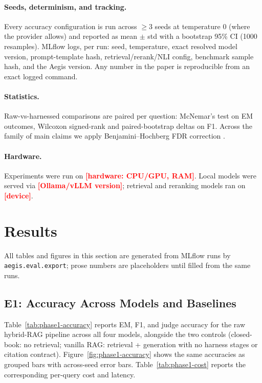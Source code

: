 \documentclass[twocolumn,10pt]{article}
\newcommand{\NUM}[1]{\textcolor{red}{\textbf{[#1]}}}
\begin{document}
\paragraph{Seeds, determinism, and tracking.}
Every accuracy configuration is run across $\geq 3$ seeds at temperature $0$
(where the provider allows) and reported as mean $\pm$ std with a bootstrap
95\% CI (1000 resamples). MLflow logs, per run: seed, temperature, exact
resolved model version, prompt-template hash, retrieval/rerank/NLI config,
benchmark sample hash, and the Aegis version. Any number in the paper is
reproducible from an exact logged command.

\paragraph{Statistics.}
Raw-vs-harnessed comparisons are paired per question: McNemar's test
\citep{mcnemar1947} on EM outcomes, Wilcoxon signed-rank
\citep{wilcoxon1945} and paired-bootstrap deltas on F1. Across the family of
main claims we apply Benjamini--Hochberg FDR correction
\citep{benjamini1995fdr}.

\paragraph{Hardware.}
Experiments were run on \NUM{hardware: CPU/GPU, RAM}. Local models were served
via \NUM{Ollama/vLLM version}; retrieval and reranking models ran on
\NUM{device}.

\section{Results}
\label{sec:results}

All tables and figures in this section are generated from MLflow runs by
\texttt{aegis.eval.export}; prose numbers are placeholders until filled from
the same runs.

\subsection{E1: Accuracy Across Models and Baselines}
\label{sec:e1}
Table~\ref{tab:phase1-accuracy} reports EM, F1, and judge accuracy for the raw
hybrid-RAG pipeline across all four models, alongside the two controls
(closed-book: no retrieval; vanilla RAG: retrieval + generation with no
harness stages or citation contract). Figure~\ref{fig:phase1-accuracy} shows
the same accuracies as grouped bars with across-seed error bars.
Table~\ref{tab:phase1-cost} reports the corresponding per-query cost and
latency.
\end{document}
